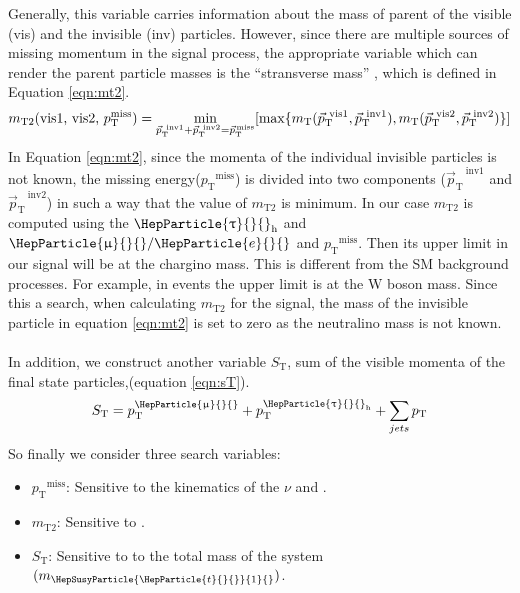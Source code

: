 \documentclass[11.5pt, a4paper]{article}
\newcommand{\pt}{\ensuremath{p_{\mathrm{T}}}\xspace}
\newcommand{\ptmiss}{\ensuremath{\pt^\text{miss}}}
\newcommand{\mT}{\ensuremath{m_{\mathrm{T}}}\xspace}
\newcommand{\ptvec}{\ensuremath{{\vec p}_{\mathrm{T}}}\xspace}
\newcommand{\ptvecmiss}{\ensuremath{{\vec p}_{\mathrm{T}}^{\kern1pt\text{miss}}}\xspace}
\newcommand{\mTii}{\ensuremath{m_{\mathrm{T2}}}\xspace}
\newcommand{\ST}{\ensuremath{S_{\mathrm{T}}}\xspace}
\DeclareRobustCommand{\PQt}{\HepParticle{t}{}{}} %
\DeclareRobustCommand{\PAQt}{{\HepAntiParticle{\PQt}{}{}}\xspace} %
\DeclareRobustCommand{\Pe}{{\HepParticle{e}{}{}}\xspace} %
\DeclareRobustCommand{\PGm}{{\HepParticle{\upmu}{}{}}\xspace} %
\DeclareRobustCommand{\PGt}{{\HepParticle{\uptau}{}{}}\xspace} %
\DeclareRobustCommand{\PSQtDo}{{\HepSusyParticle{\PQt}{1}{}}\xspace}
\DeclareRobustCommand{\PSGc}{{\HepSusyParticle{\upchi}{}{}}\xspace} %
\DeclareRobustCommand{\PSGczDo}{{\HepParticle{\PSGc}{1}{0}}\xspace}
\DeclareRobustCommand{\PSGcpmDo}{{\HepParticle{\PSGc}{1}{\pm}}\xspace}
\newcommand{\ttbar}{\PQt{}\PAQt} %
\newcommand{\tauh}{\ensuremath{\PGt_\mathrm{h}}\xspace}
\begin{document}
Generally, this variable carries information about the mass of parent of the visible (vis) and the invisible (inv) particles. However, since there are multiple sources of missing momentum in the signal process, the appropriate variable which can render the parent particle masses is the ``stransverse mass'' \cite{Lester:1999tx, Barr:2003rg, Barr:2009wu}, which is defined in Equation \ref{eqn:mt2}.
\begin{equation}
\mTii(\text{vis1, vis2, \ptmiss}) = \min_{\ptvec^{~\text{inv1}}+\ptvec^{~\text{inv2}}=\ptvecmiss}[\max\{\mT(\ptvec^{~\text{vis1}},\ptvec^{~\text{inv1}}), \mT(\ptvec^{~\text{vis2}},\ptvec^{~\text{inv2}})\}]
\label{eqn:mt2}
\end{equation}
In Equation \ref{eqn:mt2}, since the momenta of the individual invisible particles is not known, the missing energy(\ptmiss) is divided into two components ($\ptvec^{~\text{inv1}}$ and $\ptvec^{~\text{inv2}}$) in such a way that the value of $\mTii$ is minimum. In our case $\mTii$ is computed using the \tauh and $\PGm/\Pe$ and \ptmiss. Then its upper limit in our signal will be at the chargino mass. This is different from the SM background processes. For example, in \ttbar events the upper limit is at the W boson mass. Since this a search, when calculating $\mTii$ for the signal, the mass of the invisible particle in equation \ref{eqn:mt2} is set to zero as the neutralino mass is not known.\\
\\
In addition, we construct another variable $\ST$, sum of the visible momenta of the final state particles,(equation \ref{eqn:sT}).
\begin{equation}
\ST= \pt^{\PGm}+\pt^{\tauh}+\sum_{jets}\pt
\label{eqn:sT}
\end{equation}
So finally we consider three search variables:
\begin{itemize}
	\item \ptmiss: Sensitive to the kinematics of the $\nu$ and \PSGczDo.
	\item $\mTii$: Sensitive to \PSGcpmDo.
	\item $\ST$: Sensitive to to the total mass of the system $(m_{\PSQtDo})$.
\end{itemize}
\end{document}
